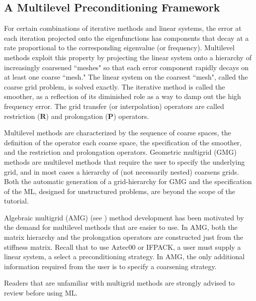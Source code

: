 \subsection{A Multilevel Preconditioning Framework}
\label{ml:theoretical}
For certain combinations of iterative methods and linear systems, the
error at each iteration projected onto the eigenfunctions has components
that decay at a rate proportional to the corresponding eigenvalue (or
frequency).  Multilevel methods exploit this property \cite{Briggs2000}
by projecting the linear system onto a hierarchy of increasingly
coarsened ``meshes" so that each error component rapidly decays on at
least one coarse ``mesh."  The linear system on the coarsest ``mesh",
called the coarse grid problem, is solved exactly.  The iterative method
is called the smoother, as a reflection of its diminished role as a way
to damp out the high frequency error.  The grid transfer (or
interpolation) operators are called restriction ($\mathbf{R}$) and
prolongation ($\mathbf{P}$) operators.

Multilevel methods are characterized by 
the sequence of coarse spaces, 
the definition of the operator each coarse space,
the specification of the smoother, and the 
restriction and prolongation operators.
Geometric multigrid (GMG) methods  are multilevel methods 
that require the user to specify the underlying grid, and
in most cases a hierarchy of (not necessarily nested) coarsens grids.
Both the automatic generation of a grid-hierarchy for GMG and the 
specification of the ML, designed for unstructured problems,
are beyond the scope of the tutorial.

Algebraic multigrid (AMG)  (see \cite[Section 8]{Briggs2000}) 
method development has been motivated by the demand for multilevel
methods that are easier to use.
In AMG, both the matrix hierarchy and the prolongation operators are
constructed just from the stiffness matrix.  
Recall that to use Aztec00 or IFPACK,  a user must 
supply a linear system, a select a preconditioning strategy.
In AMG, the only additional information required 
from the user is to specify a coarsening strategy.

Readers that are unfamiliar with multigrid methods are strongly advised to
review \cite{Briggs2000} before using ML.

